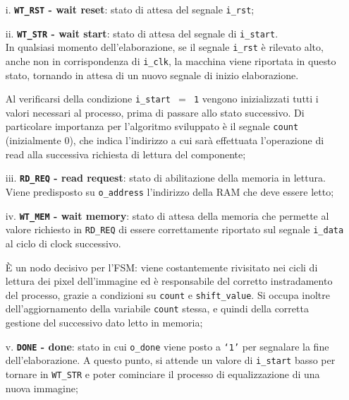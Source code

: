 \documentclass{article}
\begin{document}
\begin{itemize}
    \item [i.]      \textbf{\texttt{WT\_RST} - wait reset}: stato di attesa del segnale \texttt{i\_rst};
    \item [ii.]     \textbf{\texttt{WT\_STR} - wait start}: stato di attesa del segnale di \texttt{i\_start}. \\
                    In qualsiasi momento dell’elaborazione, se il segnale \texttt{i\_rst} è rilevato alto\footnotemark, anche non in corrispondenza di \texttt{i\_clk}, la macchina viene riportata in questo stato, tornando in attesa di un nuovo segnale di inizio elaborazione.\par
                    Al verificarsi della condizione \texttt{i\_start $=$ 1} vengono inizializzati tutti i valori necessari al processo, prima di passare allo stato successivo. Di particolare importanza per l’algoritmo sviluppato è il segnale \texttt{count} (inizialmente 0), che indica l’indirizzo a cui sarà effettuata l’operazione di read alla successiva richiesta di lettura del componente;
    \item [iii.]    \textbf{\texttt{RD\_REQ} - read request}: stato di abilitazione della memoria in lettura. Viene predisposto su \texttt{o\_address} l’indirizzo della RAM che deve essere letto;
    \item [iv.]     \textbf{\texttt{WT\_MEM} - wait memory}: stato di attesa della memoria che permette al valore richiesto in \texttt{RD\_REQ} di essere correttamente riportato sul segnale \texttt{i\_data} al ciclo di clock successivo. \par
                    È un nodo decisivo per l’FSM: viene costantemente rivisitato nei cicli di lettura dei pixel dell’immagine ed è responsabile del corretto instradamento del processo, grazie a condizioni su \texttt{count} e \texttt{shift\_value}. Si occupa inoltre dell’aggiornamento della variabile \texttt{count} stessa, e quindi della corretta gestione del successivo dato letto in memoria;
    \item [v.]      \textbf{\texttt{DONE} - done}: stato in cui \texttt{o\_done} viene posto a \texttt{‘1’} per segnalare la fine dell’elaborazione. A questo punto, si attende un valore di \texttt{i\_start} basso per tornare in \texttt{WT\_STR} e poter cominciare il processo di equalizzazione di una nuova immagine;
\end{itemize}
\end{document}
